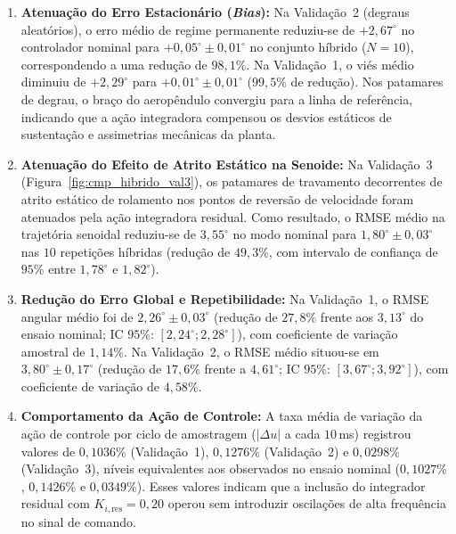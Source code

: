 \begin{enumerate}
    \item \textbf{Atenuação do Erro Estacionário (\textit{Bias}):} Na Validação~2 (degraus aleatórios), o erro médio de regime permanente reduziu-se de $+2{,}67^\circ$ no controlador nominal para $+0{,}05^\circ \pm 0{,}01^\circ$ no conjunto híbrido ($N = 10$), correspondendo a uma redução de $98{,}1\%$. Na Validação~1, o viés médio diminuiu de $+2{,}29^\circ$ para $+0{,}01^\circ \pm 0{,}01^\circ$ ($99{,}5\%$ de redução). Nos patamares de degrau, o braço do aeropêndulo convergiu para a linha de referência, indicando que a ação integradora compensou os desvios estáticos de sustentação e assimetrias mecânicas da planta.
    
    \item \textbf{Atenuação do Efeito de Atrito Estático na Senoide:} Na Validação~3 (Figura~\ref{fig:cmp_hibrido_val3}), os patamares de travamento decorrentes de atrito estático de rolamento nos pontos de reversão de velocidade foram atenuados pela ação integradora residual. Como resultado, o RMSE médio na trajetória senoidal reduziu-se de $3{,}55^\circ$ no modo nominal para $1{,}80^\circ \pm 0{,}03^\circ$ nas $10$ repetições híbridas (redução de $49{,}3\%$, com intervalo de confiança de $95\%$ entre $1{,}78^\circ$ e $1{,}82^\circ$).
    
    \item \textbf{Redução do Erro Global e Repetibilidade:} Na Validação~1, o RMSE angular médio foi de $2{,}26^\circ \pm 0{,}03^\circ$ (redução de $27{,}8\%$ frente aos $3{,}13^\circ$ do ensaio nominal; IC $95\%$: $[2{,}24^\circ; 2{,}28^\circ]$), com coeficiente de variação amostral de $1{,}14\%$. Na Validação~2, o RMSE médio situou-se em $3{,}80^\circ \pm 0{,}17^\circ$ (redução de $17{,}6\%$ frente a $4{,}61^\circ$; IC $95\%$: $[3{,}67^\circ; 3{,}92^\circ]$), com coeficiente de variação de $4{,}58\%$.
    
    \item \textbf{Comportamento da Ação de Controle:} A taxa média de variação da ação de controle por ciclo de amostragem ($|\Delta u|$ a cada $10$\,ms) registrou valores de $0{,}1036\%$ (Validação~1), $0{,}1276\%$ (Validação~2) e $0{,}0298\%$ (Validação~3), níveis equivalentes aos observados no ensaio nominal ($0{,}1027\%$, $0{,}1426\%$ e $0{,}0349\%$). Esses valores indicam que a inclusão do integrador residual com $K_{i,\text{res}} = 0{,}20$ operou sem introduzir oscilações de alta frequência no sinal de comando.
    
\end{enumerate}

